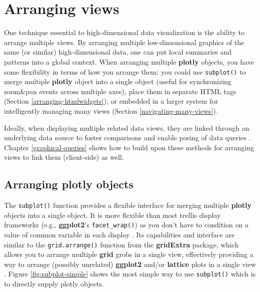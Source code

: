 \documentclass[
  12pt,
]{krantz}
\begin{document}
\hypertarget{arranging-views}{%
\chapter{Arranging views}\label{arranging-views}}

One technique essential to high-dimensional data visualization is the ability to arrange multiple views. By arranging multiple low-dimensional graphics of the same (or similar) high-dimensional data, one can put
local summaries and patterns into a global context. When arranging multiple \textbf{plotly} objects, you have some flexibility in terms of how you arrange them: you could use \texttt{subplot()} to merge multiple \textbf{plotly} object into a single object (useful for synchronizing zoom\&pan events across multiple axes), place them in separate HTML tags (Section \ref{arranging-htmlwidgets}), or embedded in a larger system for intelligently managing many views (Section \ref{navigating-many-views}).

Ideally, when displaying multiple related data views, they are linked through an underlying data source to foster comparisons and enable posing of data queries \citep{Cook:2007uk}. Chapter \ref{graphical-queries} shows how to build upon these methods for arranging views to link them (client-side) as well.

\hypertarget{arranging-plotly-objects}{%
\section{Arranging plotly objects}\label{arranging-plotly-objects}}


The \texttt{subplot()} function provides a flexible interface for merging multiple \textbf{plotly} objects into a single object. It is more flexible than most trellis display frameworks (e.g., \textbf{ggplot2}'s \texttt{facet\_wrap()}) as you don't have to condition on a value of common variable in each display \citep{trellis}. Its capabilities and interface are similar to the \texttt{grid.arrange()} function from the \textbf{gridExtra} package, which allows you to arrange multiple \textbf{grid} grobs in a single view, effectively providing a way to arrange (possibly unrelated) \textbf{ggplot2} and/or \textbf{lattice} plots in a single view \citep{RCore, gridExtra, lattice}. Figure \ref{fig:subplot-simple} shows the most simple way to use \texttt{subplot()} which is to directly supply plotly objects.
\end{document}

